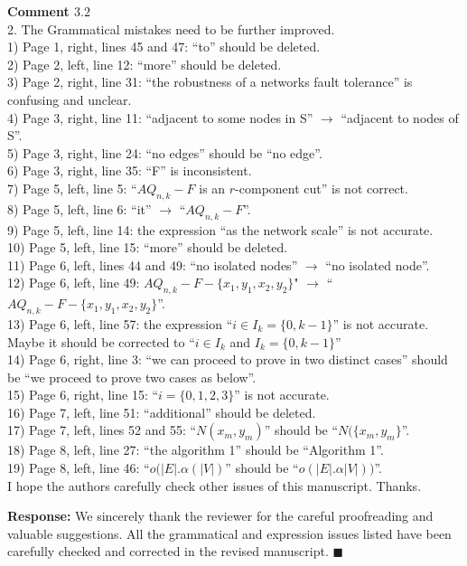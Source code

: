 \documentclass[12pt]{article}
\begin{document}
\begin{shaded}
    \noindent \textbf{Comment $3.2$}\\
2. The Grammatical mistakes need to be further improved.\\
1) Page 1, right, lines 45 and 47: ``to'' should be deleted.\\
2) Page 2, left, line 12: ``more'' should be deleted.\\
3) Page 2, right, line 31:  ``the robustness of a networks fault tolerance'' is confusing and unclear.\\
4) Page 3, right, line 11: ``adjacent to some nodes in S'' $\rightarrow$ ``adjacent to nodes of S''.\\
5) Page 3, right, line 24: ``no edges'' should be ``no edge''.\\
6) Page 3, right, line 35: ``F'' is inconsistent.\\
7) Page 5, left, line 5: ``$AQ_{n, k} - F$ is an $r$-component cut'' is not correct.\\
8) Page 5, left, line 6: ``it'' $\rightarrow$ ``$AQ_{n, k} - F$''.\\
9) Page 5, left, line 14: the expression ``as the network scale'' is not accurate.\\
10) Page 5, left, line 15: ``more'' should be deleted.\\
11) Page 6, left, lines 44 and 49: ``no isolated nodes''  $\rightarrow$ ``no isolated node''.\\
12) Page 6, left, line 49: $AQ_{n, k} - F - \{x_1, y_1, x_2, y_2\}$" $\rightarrow$ ``$AQ_{n, k} - F - \{x_1, y_1, x_2, y_2\}$''.\\
13) Page 6, left, line 57: the expression ``$i \in I_k = \{0, k - 1\}$'' is not accurate. Maybe it should be corrected to ``$i \in I_k$ and $I_k = \{0, k - 1\}$''\\
14) Page 6, right, line 3: ``we can proceed to prove in two distinct cases'' should be ``we proceed to prove two cases as below''.\\
15) Page 6, right, line 15: ``$i = \{0, 1, 2, 3\}$'' is not accurate.\\
16) Page 7, left, line 51: ``additional'' should be deleted.\\
17) Page 7, left, lines 52 and 55: ``$N(x_m, y_m)$'' should be ``$N(\{x_m, y_m\}$''.\\
18) Page 8, left, line 27: ``the algorithm 1'' should be ``Algorithm 1''.\\
19) Page 8, left, line 46: ``$o(|E|.\alpha(|V|)$'' should be ``$o(|E|.\alpha|V|))$''.\\
I hope the authors carefully check other issues of this manuscript. Thanks.

\end{shaded}
\noindent \textbf{Response:} 
We sincerely thank the reviewer for the careful proofreading and valuable suggestions. All the grammatical and expression issues listed have been carefully checked and corrected in the revised manuscript.
\hfill  $\blacksquare$



% 
% 
\end{document}
